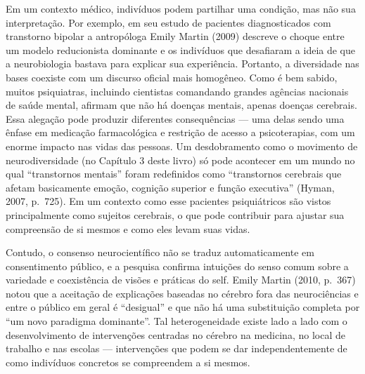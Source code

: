 Em um contexto médico, indivíduos podem partilhar uma condição, mas não
sua interpretação. Por exemplo, em seu estudo de pacientes
diagnosticados com transtorno bipolar a antropóloga Emily Martin (2009)
descreve o choque entre um modelo reducionista dominante e os indivíduos
que desafiaram a ideia de que a neurobiologia bastava para explicar sua
experiência. Portanto, a diversidade nas bases coexiste com um discurso
oficial mais homogêneo. Como é bem sabido, muitos psiquiatras, incluindo
cientistas comandando grandes agências nacionais de saúde mental,
afirmam que não há doenças mentais, apenas doenças cerebrais. Essa
alegação pode produzir diferentes consequências --- uma delas sendo uma
ênfase em medicação farmacológica e restrição de acesso a psicoterapias,
com um enorme impacto nas vidas das pessoas. Um desdobramento como o
movimento de neurodiversidade (no Capítulo 3 deste livro) só pode
acontecer em um mundo no qual ``transtornos mentais'' foram redefinidos
como ``transtornos cerebrais que afetam basicamente emoção, cognição
superior e função executiva'' (Hyman, 2007, p.~725). Em um contexto como
esse pacientes psiquiátricos são vistos principalmente como sujeitos
cerebrais, o que pode contribuir para ajustar sua compreensão de si
mesmos e como eles levam suas vidas.

Contudo, o consenso neurocientífico não se traduz automaticamente em
consentimento público, e a pesquisa confirma intuições do senso comum
sobre a variedade e coexistência de visões e práticas do self. Emily
Martin (2010, p.~367) notou que a aceitação de explicações baseadas no
cérebro fora das neurociências e entre o público em geral é ``desigual''
e que não há uma substituição completa por ``um novo paradigma
dominante''. Tal heterogeneidade existe lado a lado com o
desenvolvimento de intervenções centradas no cérebro na medicina, no
local de trabalho e nas escolas --- intervenções que podem se dar
independentemente de como indivíduos concretos se compreendem a si
mesmos.

